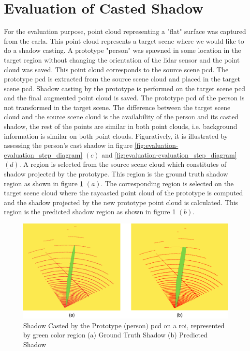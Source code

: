 \section{Evaluation of Casted Shadow}
For the evaluation purpose, point cloud representing a "flat" surface was captured from the \acrshort{carla}. This point cloud represents a target scene where we would like to do a shadow casting. A prototype "person" was spawned in some location in the target region without changing the orientation of the lidar sensor and the point cloud was saved. This point cloud corresponds to the source scene \acrshort{pcd}. The prototype \acrshort{pcd} is extracted from the source scene cloud and placed in the target scene \acrshort{pcd}. Shadow casting by the prototype is performed on the target scene \acrshort{pcd} and the final augmented point cloud is saved. The prototype \acrshort{pcd} of the person is not transformed in the target scene. The difference between the target scene cloud and the source scene cloud is the availability of the person and its casted shadow, the rest of the points are similar in both point clouds, i.e. background information is similar on both point clouds. 
Figuratively, it is illustrated by assessing the person's cast shadow in figure \ref{fig:evaluation-evaluation_step_diagram} \((c)\) and \ref{fig:evaluation-evaluation_step_diagram} \((d)\).
A region is selected from the source scene cloud which constitutes of shadow projected by the prototype. This region is the ground truth shadow region as shown in figure \ref{fig:evaluation-shadow_difference_roi} \((a)\). The corresponding region is selected on the target scene cloud where the raycasted point cloud of the prototype is computed and the shadow projected by the new prototype point cloud is calculated. This region is the predicted shadow region as shown in figure \ref{fig:evaluation-shadow_difference_roi} \((b)\).
\begin{figure}[htbp]
    \centering
    \includegraphics[width=1\linewidth]{97_graphics//evaluation/shadow_difference_roi.pdf}
    \caption[Shadow Casted by the Prototype]{Shadow Casted by the Prototype (person) \acrshort{pcd} on a \acrshort{roi}, represented by green color region (a) Ground Truth Shadow (b) Predicted Shadow}
    \label{fig:evaluation-shadow_difference_roi}
\end{figure}

